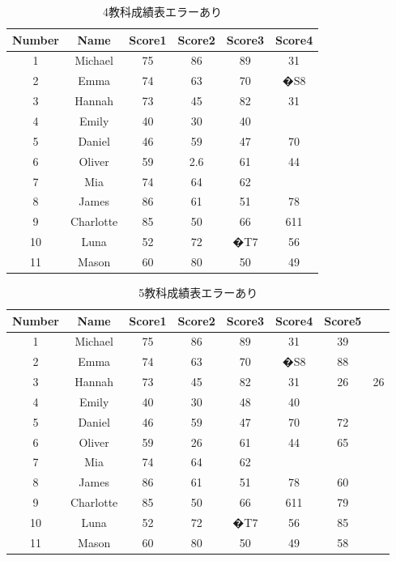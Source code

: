 \documentclass[dvipdfmx]{jsarticle}
\begin{document}
\begin{table}[H]
  \begin{tabular}{cccccc}
    Number & Name & Score1 & Score2 & Score3 & Score4 \\ \hline
    1 & Michael & 75 & 86 & 89 & 31 \\
    2 & Emma & 74 & 63 & 70 & �S8 \\
    3 & Hannah & 73 & 45 & 82 & 31 \\
    4 & Emily & 40 & 30 & 40 \\
    5 & Daniel & 46 & 59 & 47 & 70 \\
    6 & Oliver & 59 & 2.6 & 61 & 44 \\
    7 & Mia & 74 & 64 & 62 \\
    8 & James & 86 & 61 & 51 & 78 \\
    9 & Charlotte & 85 & 50 & 66 & 611 \\
    10 & Luna & 52 & 72 & �T7 & 56 \\
    11 & Mason & 60 & 80 & 50 & 49 \\
  \end{tabular}
  \centering
  \caption{4教科成績表エラーあり}
  \label{in2}
\end{table}

\begin{table}[H]
  \begin{tabular}{cccccccc}
    Number & Name & Score1 & Score2 & Score3 & Score4 & Score5 \\ \hline
    1 & Michael & 75 & 86 & 89 & 31 & 39 \\
    2 & Emma & 74 & 63 & 70 & �S8 & 88 \\
    3 & Hannah & 73 & 45 & 82 & 31 & 26 & 26 \\
    4 & Emily & 40 & 30 & 48 & 40 \\
    5 & Daniel & 46 & 59 & 47 & 70 & 72 \\
    6 & Oliver & 59 & 26 & 61 & 44 & 65 \\
    7 & Mia & 74 & 64 & 62 \\
    8 & James & 86 & 61 & 51 & 78 & 60 \\
    9 & Charlotte & 85 & 50 & 66 & 611 & 79 \\
    10 & Luna & 52 & 72 & �T7 & 56 & 85 \\
    11 & Mason & 60 & 80 & 50 & 49 & 58 \\
  \end{tabular}
  \centering
  \caption{5教科成績表エラーあり}
  \label{in3}
\end{table}
\end{document}

